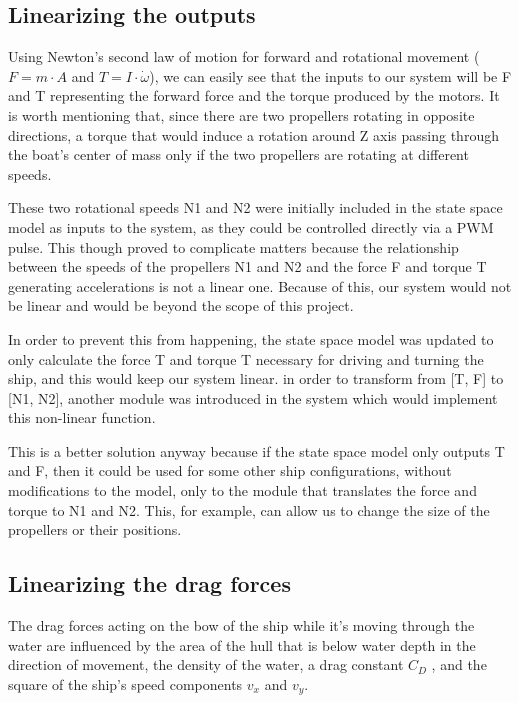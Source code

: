 \subsection{Linearizing the outputs}

Using Newton's second law of motion for forward  and rotational movement ($F = m \cdot A$ and $T = I \cdot \dot{\omega}$), we can easily see that the inputs to our system will be F and T representing the forward force and the torque produced by the motors. It is worth mentioning that, since there are two propellers rotating in opposite directions, a torque that would induce a rotation around Z axis passing through the boat's center of mass only if the two propellers are rotating at different speeds.

These two rotational speeds N1 and N2 were initially included in the state space model as inputs to the system, as they could be controlled directly via a PWM pulse. This though proved to complicate matters because the relationship between the speeds of the propellers N1 and N2 and the force F and torque T generating accelerations is not a linear one. Because of this, our system would not be linear and would be beyond the scope of this project. 


In order to prevent this from happening, the state space model was updated to only calculate the force T and torque T necessary for driving and turning the ship, and this would keep our system linear. in order to transform from [T, F] to [N1, N2], another module was introduced in the system which would implement this non-linear function. 

This is a better solution anyway because if the state space model only outputs T and F, then it could be used for some other ship configurations, without modifications to the model, only to the module that translates the force and torque to N1 and N2. This, for example, can allow us to change the size of the propellers or their positions.

\subsection{Linearizing the drag forces}
\label{sect:Linearizing drag forces}

The drag forces acting on the bow of the ship while it's moving through the water are influenced by the area of the hull that is below water depth in the direction of movement, the density of the water, a drag constant $ C_{D} $ , and the square of the ship's speed components $ v_{x} $ and $ v_{y} $. 


